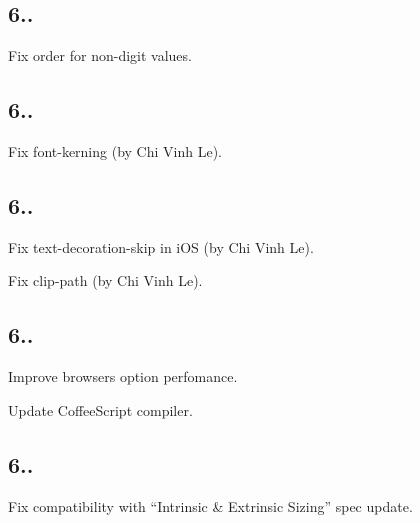 \subsection*{6..}


\begin{DoxyItemize}
\item Fix {\ttfamily order} for non-\/digit values.
\end{DoxyItemize}

\subsection*{6..}


\begin{DoxyItemize}
\item Fix {\ttfamily font-\/kerning} (by Chi Vinh Le).
\end{DoxyItemize}

\subsection*{6..}


\begin{DoxyItemize}
\item Fix {\ttfamily text-\/decoration-\/skip} in i\+OS (by Chi Vinh Le).
\item Fix {\ttfamily clip-\/path} (by Chi Vinh Le).
\end{DoxyItemize}

\subsection*{6..}


\begin{DoxyItemize}
\item Improve {\ttfamily browsers} option perfomance.
\item Update Coffee\+Script compiler.
\end{DoxyItemize}

\subsection*{6..}


\begin{DoxyItemize}
\item Fix compatibility with “\+Intrinsic \& Extrinsic Sizing” spec update.
\end{DoxyItemize}

